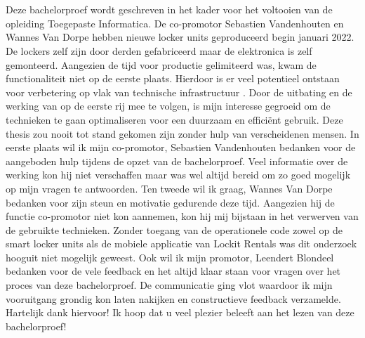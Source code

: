 
\chapter*{}%
\label{ch:voorwoord}


Deze bachelorproef wordt geschreven in het kader voor het voltooien van de opleiding Toegepaste Informatica. De co-promotor Sebastien Vandenhouten en Wannes Van Dorpe hebben nieuwe locker units geproduceerd begin januari 2022. De lockers zelf zijn door derden gefabriceerd maar de elektronica is zelf gemonteerd. Aangezien de tijd voor productie gelimiteerd was, kwam de functionaliteit niet op de eerste plaats. Hierdoor is er veel potentieel ontstaan voor verbetering op vlak van technische infrastructuur . Door de uitbating en de werking van op de eerste rij mee te volgen, is mijn interesse gegroeid om de technieken te gaan optimaliseren voor een duurzaam en efficiënt gebruik.
\newline
\newline
Deze thesis zou nooit tot stand gekomen zijn zonder hulp van verscheidenen mensen. In eerste plaats wil ik mijn co-promotor, Sebastien Vandenhouten bedanken voor de aangeboden hulp tijdens de opzet van de bachelorproef. Veel informatie over de werking kon hij niet verschaffen maar was wel altijd bereid om zo goed mogelijk op mijn vragen te antwoorden.
\newline
\newline
Ten tweede wil ik graag, Wannes Van Dorpe bedanken voor zijn steun en motivatie gedurende deze tijd. Aangezien hij de functie co-promotor niet kon aannemen, kon hij mij bijstaan in het verwerven van de gebruikte technieken. Zonder toegang van de operationele code zowel op de smart locker units als de mobiele applicatie van Lockit Rentals was dit onderzoek hooguit niet mogelijk geweest. 
\newline
\newline
Ook wil ik mijn promotor, Leendert Blondeel bedanken voor de vele feedback en het altijd klaar staan voor vragen over het proces van deze bachelorproef. De communicatie ging vlot waardoor ik mijn vooruitgang grondig kon laten nakijken en constructieve feedback verzamelde. Hartelijk dank hiervoor!
\newline
\newline
Ik hoop dat u veel plezier beleeft aan het lezen van deze bachelorproef!
